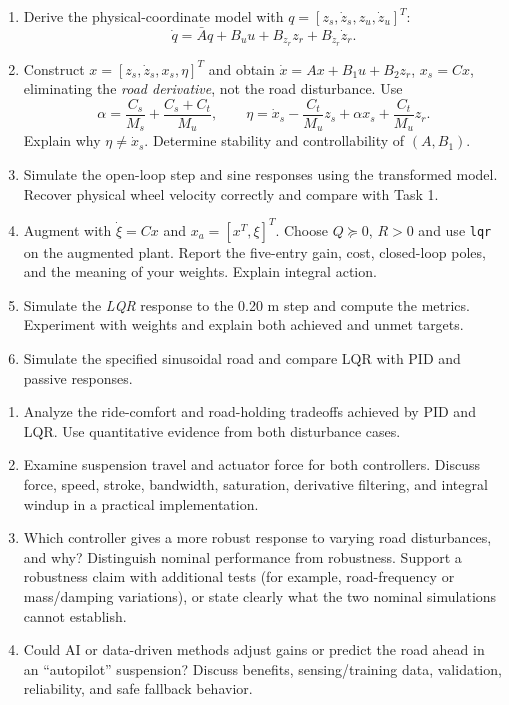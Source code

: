 \begin{enumerate}[label=\textbf{(\alph*)}]
\item Derive the physical-coordinate model with $q=[z_s,\dot z_s,z_u,\dot z_u]^T$:
\begin{equation}\dot q=\bar A q+B_u u+B_{z_r}z_r+B_{\dot z_r}\dot z_r.\end{equation}
\item Construct $x=[z_s,\dot z_s,x_s,\eta]^T$ and obtain
$\dot x=Ax+B_1u+B_2z_r$, $x_s=Cx$, eliminating the \emph{road derivative},
not the road disturbance. Use
\begin{equation}
 \alpha=\frac{C_s}{M_s}+\frac{C_s+C_t}{M_u},\qquad
 \eta=\dot x_s-\frac{C_t}{M_u}z_s+\alpha x_s+\frac{C_t}{M_u}z_r.
\end{equation}
Explain why $\eta\ne\dot x_s$. Determine stability and controllability of $(A,B_1)$.
\item Simulate the open-loop step and sine responses using the transformed model.
Recover physical wheel velocity correctly and compare with Task 1.
\item Augment with $\dot\xi=Cx$ and $x_a=[x^T,\xi]^T$. Choose $Q\succeq0$, $R>0$
and use \texttt{lqr} on the augmented plant. Report the five-entry gain, cost,
closed-loop poles, and the meaning of your weights. Explain integral action.
\item Simulate the \emph{LQR} response to the 0.20 m step and compute the metrics.
Experiment with weights and explain both achieved and unmet targets.
\item Simulate the specified sinusoidal road and compare LQR with PID and passive responses.
\end{enumerate}
\newpage
{}
\begin{enumerate}[label=\textbf{(\alph*)}]
\item Analyze the ride-comfort and road-holding tradeoffs achieved by PID and LQR.
Use quantitative evidence from both disturbance cases.
\item Examine suspension travel and actuator force for both controllers. Discuss
force, speed, stroke, bandwidth, saturation, derivative filtering, and integral
windup in a practical implementation.
\item Which controller gives a more robust response to varying road disturbances,
and why? Distinguish nominal performance from robustness. Support a robustness claim
with additional tests (for example, road-frequency or mass/damping variations), or
state clearly what the two nominal simulations cannot establish.
\item Could AI or data-driven methods adjust gains or predict the road ahead in an
``autopilot'' suspension? Discuss benefits, sensing/training data, validation,
reliability, and safe fallback behavior.
\end{enumerate}
